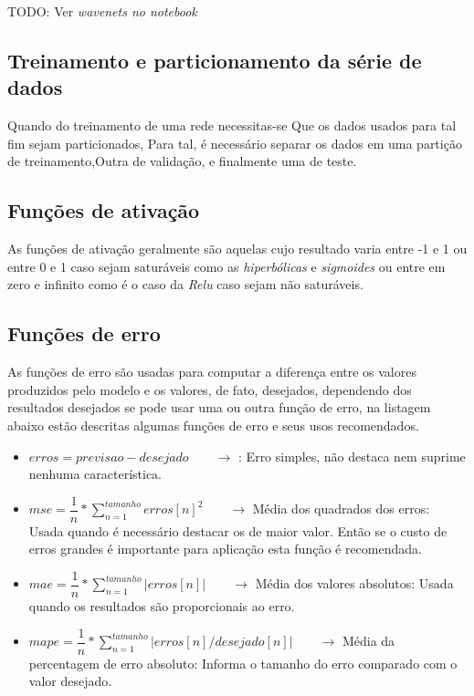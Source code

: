 			\par TODO: Ver \textit{wavenets no notebook}
			
			\par \cite{CNNC}

		\subsection{Treinamento e particionamento da série de dados}
			\par Quando do treinamento de uma rede necessitas-se Que os dados usados para tal fim sejam particionados, Para tal, é necessário separar os dados em uma partição de treinamento,Outra de validação, e finalmente uma de teste.

		\subsection{Funções de ativação}
			\par As funções de ativação geralmente são aquelas cujo resultado varia entre -1 e 1 ou entre 0 e 1 caso sejam saturáveis como as \textit{hiperbólicas} e \textit{sigmoides} ou entre em zero e infinito como é o caso da \textit{Relu} caso sejam não saturáveis.
		\subsection{Funções de erro}
			\par As funções de erro são usadas para computar a diferença entre os valores produzidos pelo modelo e os valores, de fato, desejados, dependendo dos resultados desejados se pode usar uma ou outra função de erro, na listagem abaixo estão descritas algumas funções de erro e seus usos recomendados.

			\begin{itemize}
				\item $erros = previsao - desejado  \qquad \rightarrow$ : Erro simples, não destaca nem suprime nenhuma característica.
				\item $mse = \dfrac{1}{n}*\sum_{n=1}^{tamanho} erros[n]^2 \qquad \rightarrow$ Média dos quadrados dos erros: Usada quando é necessário destacar os de maior valor. Então se o custo de erros grandes é importante para aplicação esta função é recomendada.
				\item $mae = \dfrac{1}{n}*\sum_{n=1}^{tamanho} |erros[n]| \qquad \rightarrow$ Média dos valores absolutos: Usada quando os resultados são proporcionais ao erro.
				\item $mape =  \dfrac{1}{n}*\sum_{n=1}^{tamanho} |erros[n] / desejado[n]| \qquad \rightarrow$ Média da percentagem de erro absoluto: Informa o tamanho do erro comparado com o valor desejado.
			\end{itemize}

